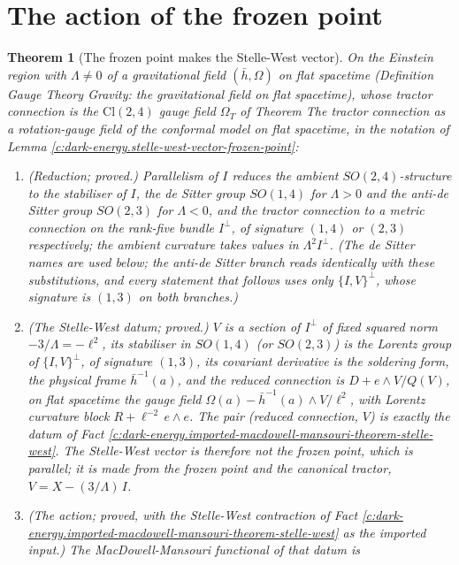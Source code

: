 \documentclass[11pt]{article}
\newtheorem{theorem}{Theorem}[section]
\theoremstyle{definition}
\theoremstyle{plain}
\newcommand{\changedmark}[2]{\marginpar{\raggedright\scriptsize\color{#1}#2}}
\providecommand{\Cl}{}\renewcommand{\Cl}{\mathrm{Cl}}
\providecommand{\hb}{}\renewcommand{\hb}{\bar{h}}
\begin{document}
\section{The action of the frozen point}

\begin{theorem}[The frozen point makes the Stelle-West vector]\label{c:dark-energy.frozen-point-makes-stelle-west-vector}
\changedmark{gray}{reworded}
On the Einstein region with $\Lambda \neq 0$ of a gravitational field $(\hb, \Omega)$ on flat spacetime (Definition \emph{Gauge Theory Gravity: the gravitational field on flat spacetime}), whose tractor connection is the $\Cl(2,4)$ gauge field $\Omega_{T}$ of Theorem \emph{The tractor connection as a rotation-gauge field of the conformal model on flat spacetime}, in the notation of Lemma \ref{c:dark-energy.stelle-west-vector-frozen-point}:
\begin{enumerate}
\item[(i)] \emph{(Reduction; proved.)} Parallelism of $I$ reduces the ambient $SO(2,4)$-structure to the stabiliser of $I$, the de Sitter group $SO(1,4)$ for $\Lambda > 0$ and the anti-de Sitter group $SO(2,3)$ for $\Lambda < 0$, and the tractor connection to a metric connection on the rank-five bundle $I^\perp$, of signature $(1,4)$ or $(2,3)$ respectively; the ambient curvature takes values in $\Lambda^2 I^\perp$. (The de Sitter names are used below; the anti-de Sitter branch reads identically with these substitutions, and every statement that follows uses only $\{I,V\}^\perp$, whose signature is $(1,3)$ on both branches.)
\item[(ii)] \emph{(The Stelle-West datum; proved.)} $V$ is a section of $I^\perp$ of fixed squared norm $-3/\Lambda = -\ell^2$, its stabiliser in $SO(1,4)$ (or $SO(2,3)$) is the Lorentz group of $\{I, V\}^\perp$, of signature $(1,3)$, its covariant derivative is the soldering form, the physical frame $\hb^{-1}(a)$, and the reduced connection is $D + e\wedge V/Q(V)$, on flat spacetime the gauge field $\Omega(a) - \hb^{-1}(a) \wedge V/\ell^{2}$, with Lorentz curvature block $R + \ell^{-2}\,e\wedge e$. The pair (reduced connection, $V$) is exactly the datum of Fact \ref{c:dark-energy.imported-macdowell-mansouri-theorem-stelle-west}. The Stelle-West vector is therefore not the frozen point, which is parallel; it is made from the frozen point and the canonical tractor, $V = X - (3/\Lambda)\,I$.
\item[(iii)] \emph{(The action; proved, with the Stelle-West contraction of Fact \ref{c:dark-energy.imported-macdowell-mansouri-theorem-stelle-west} as the imported input.)} The MacDowell-Mansouri functional of that datum is

\end{enumerate}
\end{theorem}
\end{document}

